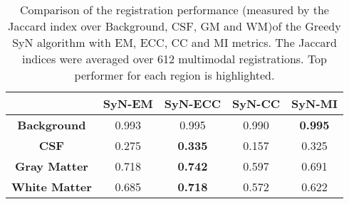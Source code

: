 \begin{table}[htbp]
  \centering
  {\small
    \begin{tabular}{ccccc}
    \toprule
          & \textbf{SyN-EM} & \textbf{SyN-ECC} & \textbf{SyN-CC} & \textbf{SyN-MI} \\
    \midrule
    \textbf{Background} & 0.993 & 0.995 & 0.990 & \textbf{0.995} \\
    \textbf{CSF} & 0.275 & \textbf{0.335} & 0.157 & 0.325 \\
    \textbf{Gray Matter} & 0.718 & \textbf{0.742} & 0.597 & 0.691 \\
    \textbf{White Matter} & 0.685 & \textbf{0.718} & 0.572 & 0.622 \\
    \bottomrule
    \end{tabular}}%
  \caption{Comparison of the registration performance (measured by the Jaccard index over Background, CSF, GM and WM)of the Greedy SyN algorithm with EM, ECC, CC and MI metrics.
The Jaccard indices were averaged over 612 multimodal registrations. Top performer for each region is highlighted.}
  \label{tab:multimodal_results_segTri_fill}%
\end{table}%
